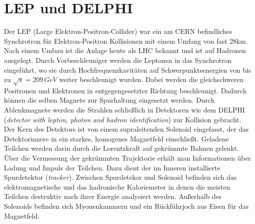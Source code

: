 \documentclass{include/thesisclass3}
\newcommand{\e}[1]{\,\si{#1}}
\begin{document}
\section{LEP und DELPHI}
Der LEP (Large Elektron-Positron-Collider) war ein am CERN befindliches Synchrotron für Elektron-Positron Kollisionen mit einem Umfang von fast 28km. Nach einem Umbau ist die Anlage heute als LHC bekannt und ist auf Hadronen ausgelegt. Durch Vorbeschleuniger werden die Leptonen in das Synchrotron eingeführt, wo sie durch Hochfrequenzkavitäten auf Schwerpunktsenergien von bis zu $\sqrt{s}=209\e{GeV}$ weiter beschleunigt wurden. Dabei werden die gleichschweren Positronen und Elektronen in entgegengesetzter Richtung beschleunigt. Dadurch können die selben Magnete zur Spurhaltung eingesetzt werden. Durch Ablenkmagnete werden die Strahlen schließlich in Detektoren wie dem DELPHI (\textit{detector with lepton, photon and hadron identification}) zur Kollision gebracht. 
Der Kern des Detektors ist von einem supraleitenden Solenoid eingefasst, der das Detektorinnere in ein starkes, homogenes Magnetfeld einschließt. 
Geladene Teilchen werden darin durch die Lorentzkraft auf gekrümmte Bahnen gelenkt. 
Über die Vermessung der gekrümmten Trajektorie erhält man Informationen über Ladung und Impuls der Teilchen. 
Dazu dient der im Inneren installierte Spurdetektor (\textit{tracker}). 
Zwischen Spurdetekor und Solenoid befinden sich das elektromagnetische und das hadronische Kaloriemeter in denen die meisten Teilchen destruktiv nach ihrer Energie analysiert werden. 
Außerhalb des Solenoids befinden sich Myonenkammern und ein Rückführjoch aus Eisen für das Magnetfeld. 
\end{document}

